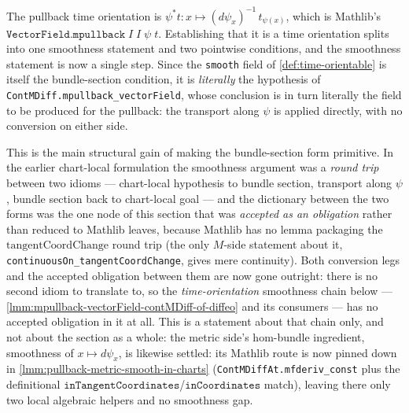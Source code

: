 The pullback time orientation is $\psi^*t : x \mapsto (d\psi_x)^{-1}\,t_{\psi(x)}$, which is Mathlib's $\mathtt{VectorField.mpullback}\;I\;I\;\psi\;t$. Establishing that it is a time orientation splits into one smoothness statement and two pointwise conditions, and the smoothness statement is now a single step. Since the \texttt{smooth} field of \ref{def:time-orientable} is itself the bundle-section condition, it is \emph{literally} the hypothesis of \texttt{ContMDiff.mpullback\_vectorField}, whose conclusion is in turn literally the field to be produced for the pullback: the transport along $\psi$ is applied directly, with no conversion on either side.

This is the main structural gain of making the bundle-section form primitive. In the earlier chart-local formulation the smoothness argument was a \emph{round trip} between two idioms --- chart-local hypothesis to bundle section, transport along $\psi$, bundle section back to chart-local goal --- and the dictionary between the two forms was the one node of this section that was \emph{accepted as an obligation} rather than reduced to Mathlib leaves, because Mathlib has no lemma packaging the $\mathrm{tangentCoordChange}$ round trip (the only $M$-side statement about it, \texttt{continuousOn\_tangentCoordChange}, gives mere continuity). Both conversion legs and the accepted obligation between them are now gone outright: there is no second idiom to translate to, so the \emph{time-orientation} smoothness chain below --- \ref{lmm:mpullback-vectorField-contMDiff-of-diffeo} and its consumers --- has no accepted obligation in it at all. This is a statement about that chain only, and not about the section as a whole: the metric side's hom-bundle ingredient, smoothness of $x \mapsto d\psi_x$, is likewise settled: its Mathlib route is now pinned down in \ref{lmm:pullback-metric-smooth-in-charts} (\texttt{ContMDiffAt.mfderiv\_const} plus the definitional $\mathtt{inTangentCoordinates}$/$\mathtt{inCoordinates}$ match), leaving there only two local algebraic helpers and no smoothness gap.

